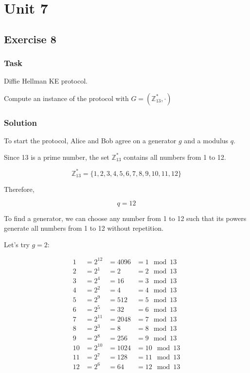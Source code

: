 \chapter*{Unit 7}
\section*{Exercise 8}

\subsection*{Task}

Diffie Hellman KE protocol.

Compute an instance of the protocol with $G = (\mathbb{Z}_{13}^*, \cdot)$


\subsection*{Solution}

To start the protocol, Alice and Bob agree on a generator $g$ and a modulus $q$.

Since 13 is a prime number, the set $\mathbb{Z}_{13}^*$ contains all numbers from 1 to 12.

\begin{equation}
    \mathbb{Z}_{13}^* = \{1, 2, 3, 4, 5, 6, 7, 8, 9, 10, 11, 12\}
\end{equation}

Therefore, 

\begin{equation}
    q = 12
\end{equation}

To find a generator, we can choose any number from 1 to 12 such that its powers generate all numbers from 1 to 12 without repetition.

Let's try $g = 2$:

\begin{align}
1 &= 2^{12} &= 4096 &= 1 \mod 13 \\
2 &= 2^1    &= 2    &= 2 \mod 13 \\
3 &= 2^4    &= 16   &= 3 \mod 13 \\
4 &= 2^2    &= 4    &= 4 \mod 13 \\
5 &= 2^9    &= 512  &= 5 \mod 13 \\
6 &= 2^5    &= 32   &= 6 \mod 13 \\
7 &= 2^{11} &= 2048 &= 7 \mod 13 \\
8 &= 2^3    &= 8    &= 8 \mod 13 \\
9 &= 2^8    &= 256  &= 9 \mod 13 \\
10 &= 2^{10} &= 1024 &= 10 \mod 13 \\
11 &= 2^7    &= 128  &= 11 \mod 13 \\
12 &= 2^6    &= 64   &= 12 \mod 13
\end{align}

